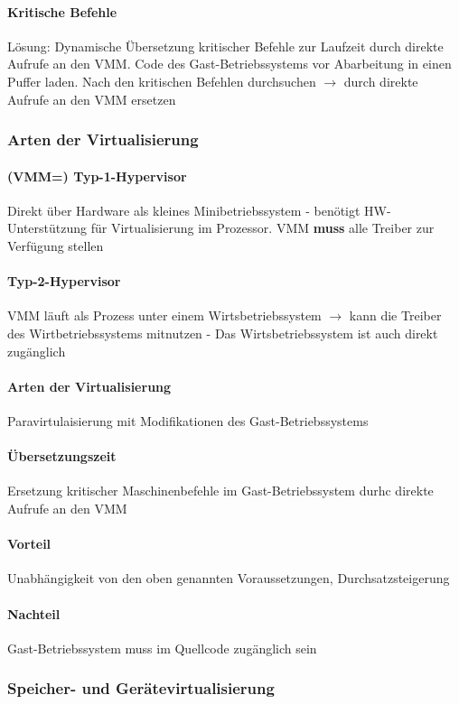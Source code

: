 \documentclass[10pt,a4paper,landscape]{article}
\begin{document}
\begin{multicols*}{3}
	\paragraph{Kritische Befehle} Lösung: Dynamische Übersetzung kritischer Befehle zur Laufzeit durch direkte Aufrufe an den VMM. Code des Gast-Betriebssystems vor Abarbeitung in einen Puffer laden. Nach den kritischen Befehlen durchsuchen $\rightarrow$ durch direkte Aufrufe an den VMM ersetzen
	\subsubsection{Arten der Virtualisierung}
	\paragraph{(VMM=) Typ-1-Hypervisor} Direkt über Hardware als kleines Minibetriebssystem - benötigt HW-Unterstützung für Virtualisierung im Prozessor. VMM \textbf{muss} alle Treiber zur Verfügung stellen
	\paragraph{Typ-2-Hypervisor} VMM läuft als Prozess unter einem Wirtsbetriebssystem $\rightarrow$ kann die Treiber des Wirtbetriebssystems mitnutzen - Das Wirtsbetriebssystem ist auch direkt zugänglich
	\paragraph{Arten der Virtualisierung} Paravirtulaisierung mit Modifikationen des Gast-Betriebssystems
	\paragraph{Übersetzungszeit} Ersetzung kritischer Maschinenbefehle im Gast-Betriebssystem durhc direkte Aufrufe an den VMM
	\paragraph{Vorteil} Unabhängigkeit von den oben genannten Voraussetzungen, Durchsatzsteigerung
	\paragraph{Nachteil} Gast-Betriebssystem muss im Quellcode zugänglich sein
	\subsubsection{Speicher- und Gerätevirtualisierung}

\end{multicols*}
\end{document}
